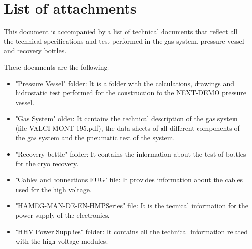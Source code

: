 \appendix 
\section{List of attachments}

This document is accompanied by a list of technical documents that reflect all the technical specifications and test performed in the gas system, pressure vessel and recovery bottles.

These documents are the following:
\begin{itemize}

\item "Pressure Vessel" folder: It is a folder with the calculations, drawings and hidrostatic test performed for the construction fo the NEXT-DEMO pressure vessel.
\item "Gas System" older: It contains the technical description of the gas system (file VALCI-MONT-195.pdf), the data sheets of all different components of the gas system and the pneumatic test of the system.
\item "Recovery bottle" folder: It contains the information about the test of bottles for the cryo recovery.
\item "Cables and connections FUG" file: It provides information about the cables used for the high voltage.
\item "HAMEG-MAN-DE-EN-HMPSeries" file: It is the tecnical information for the power supply of the electronics.
\item "HHV Power Supplies" folder: It contains all the technical information related with the high voltage modules.

\end{itemize}



